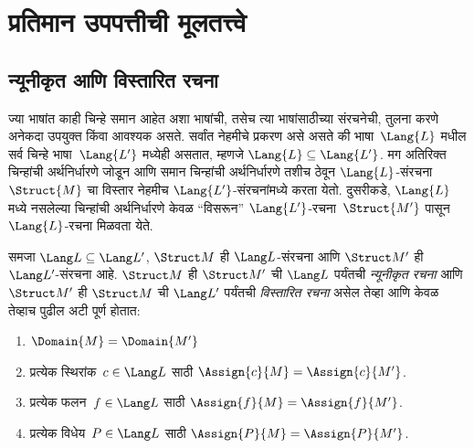 \chapter{प्रतिमान उपपत्तीची मूलतत्त्वे}\label{mod:bas::chap}








\section{न्यूनीकृत आणि विस्तारित रचना}\label{mod:bas:red:sec}

ज्या भाषांत काही चिन्हे समान आहेत अशा भाषांची, तसेच त्या भाषांसाठीच्या
संरचनेची, तुलना करणे अनेकदा उपयुक्त किंवा आवश्यक असते. सर्वांत
नेहमीचे प्रकरण असे असते की भाषा~$\Lang{L}$ मधील सर्व चिन्हे
भाषा~$\Lang{L'}$ मध्येही असतात, म्हणजे $\Lang{L} \subseteq
\Lang{L'}$. मग अतिरिक्त चिन्हांची अर्थनिर्धारणे जोडून आणि समान चिन्हांची
अर्थनिर्धारणे तशीच ठेवून $\Lang{L}$-संरचना~$\Struct{M}$ चा विस्तार
नेहमीच $\Lang{L'}$-संरचनांमध्ये करता येतो. दुसरीकडे,
$\Lang{L}$ मध्ये नसलेल्या चिन्हांची अर्थनिर्धारणे केवळ ``विसरून''
$\Lang{L'}$-रचना~$\Struct{M'}$ पासून $\Lang{L}$-रचना मिळवता येते.

\begin{defn}
\label{mod:bas:red:defn:reduct}
समजा $\Lang L \subseteq \Lang L'$, $\Struct M$ ही
$\Lang L$-संरचना आणि $\Struct M'$ ही $\Lang L'$-संरचना आहे.
$\Struct M$ ही $\Struct M'$ ची $\Lang L$ पर्यंतची \emph{न्यूनीकृत रचना}
आणि $\Struct M'$ ही $\Struct M$ ची $\Lang L'$ पर्यंतची
\emph{विस्तारित रचना} असेल तेव्हा आणि केवळ तेव्हाच पुढील अटी पूर्ण होतात:
\begin{enumerate}
\item $\Domain{M} = \Domain{M'}$
\item प्रत्येक स्थिरांक~$c \in \Lang L$ साठी $\Assign{c}{M} =
  \Assign{c}{M'}$.
\item प्रत्येक फलन~$f \in \Lang L$ साठी $\Assign{f}{M} =
  \Assign{f}{M'}$.
\item प्रत्येक विधेय~$P \in \Lang L$ साठी $\Assign{P}{M} =
  \Assign{P}{M'}$.
\end{enumerate}
\end{defn}

